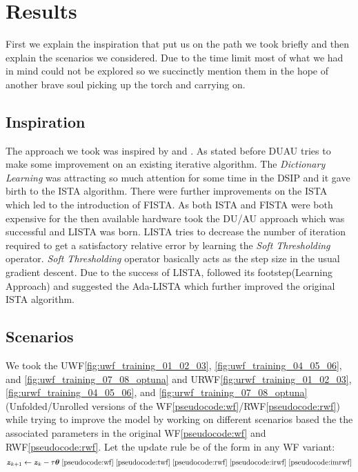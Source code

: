 \chapter{Results}

First we explain the inspiration that put us on the path we took briefly and then explain the scenarios we considered. 
Due to the time limit most of what we had in mind could not be explored so we succinctly mention them in the hope of another 
brave soul picking up the torch and carrying on.  

\section{Inspiration}

The approach we took was inspired by \cite{Aberdam2020} and \cite{Gregor2010}. As stated before \ac{DU}\ac{AU}\cite{Monga2019} 
tries to make some improvement on an existing iterative algorithm. The \emph{Dictionary Learning} was attracting so much 
attention for some time in the \ac{DSIP} and it gave birth to the \ac{ISTA}\cite{Daubechies2003} algorithm. There were further 
improvements on the \ac{ISTA}\cite{Daubechies2003} which led to the introduction of \ac{FISTA}. As both 
\ac{ISTA}\cite{Daubechies2003} and \ac{FISTA}\cite{Beck2009} were both expensive for the then available hardware\cite{Gregor2010} 
took the \ac{DU}/\ac{AU}\cite{Shechtman2015} approach which was successful and \ac{LISTA}\cite{Gregor2010} was born. 
\ac{LISTA} tries to decrease the number of iteration required to get a satisfactory relative error by learning the 
\emph{Soft Thresholding} operator. \emph{Soft Thresholding} operator basically acts as the step size in the usual gradient descent. 
Due to the success of \ac{LISTA}\cite{Gregor2010}, \cite{Aberdam2020} followed its footstep(Learning Approach) and suggested 
the \ac{Ada-LISTA} which further improved the original \ac{ISTA}\cite{Daubechies2003} algorithm.

\section{Scenarios}

We took the \ac{UWF}\cref{fig:uwf_training_01_02_03}, \ref{fig:uwf_training_04_05_06}, and \ref{fig:uwf_training_07_08_optuna} and 
\ac{URWF}\cref{fig:urwf_training_01_02_03}, \ref{fig:urwf_training_04_05_06}, and \ref{fig:urwf_training_07_08_optuna}(Unfolded/Unrolled versions of the \ac{WF}\ref{pseudocode:wf}/\ac{RWF}\ref{pseudocode:rwf}) while trying to improve the model by working on different scenarios 
based the the associated parameters in the original \ac{WF}\cite{Candes2014}\ref{pseudocode:wf} and 
\ac{RWF}\cite{Zhang2016}\ref{pseudocode:rwf}. Let the update rule be of the form in any \ac{WF}\cite{Liu2019}\cite{Jaganathan2015} variant:
\begin{equation*}
  \boldsymbol{z}_{k+1} \leftarrow \boldsymbol{z}_k - \tau\boldsymbol{\theta}\; \ref{pseudocode:wf}\;\ref{pseudocode:twf}\;\ref{pseudocode:rwf}\;\ref{pseudocode:irwf}\;\ref{pseudocode:imrwf}
\end{equation*}

